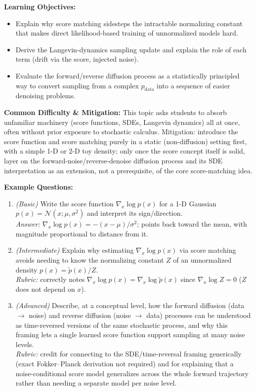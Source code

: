 \documentclass[11pt]{article}
\begin{document}
\textbf{Learning Objectives:}
\begin{itemize}
  \item Explain why score matching sidesteps the intractable normalizing constant that makes direct likelihood-based training of unnormalized models hard.
  \item Derive the Langevin-dynamics sampling update and explain the role of each term (drift via the score, injected noise).
  \item Evaluate the forward/reverse diffusion process as a statistically principled way to convert sampling from a complex $p_{\text{data}}$ into a sequence of easier denoising problems.
\end{itemize}

\textbf{Common Difficulty \& Mitigation:} This topic asks students to absorb unfamiliar machinery (score functions, SDEs, Langevin dynamics) all at once, often without prior exposure to stochastic calculus. Mitigation: introduce the score function and score matching purely in a static (non-diffusion) setting first, with a simple 1-D or 2-D toy density; only once the score concept itself is solid, layer on the forward-noise/reverse-denoise diffusion process and its SDE interpretation as an extension, not a prerequisite, of the core score-matching idea.

\textbf{Example Questions:}
\begin{enumerate}
  \item \textit{(Basic)} Write the score function $\nabla_x \log p(x)$ for a 1-D Gaussian $p(x) = \mathcal N(x;\mu,\sigma^2)$ and interpret its sign/direction. \\
  \textit{Answer:} $\nabla_x \log p(x) = -(x-\mu)/\sigma^2$; points back toward the mean, with magnitude proportional to distance from it.
  \item \textit{(Intermediate)} Explain why estimating $\nabla_x \log p(x)$ via score matching avoids needing to know the normalizing constant $Z$ of an unnormalized density $p(x) = \tilde p(x)/Z$. \\
  \textit{Rubric:} correctly notes $\nabla_x \log p(x) = \nabla_x \log \tilde p(x)$ since $\nabla_x \log Z = 0$ ($Z$ does not depend on $x$).
  \item \textit{(Advanced)} Describe, at a conceptual level, how the forward diffusion (data $\to$ noise) and reverse diffusion (noise $\to$ data) processes can be understood as time-reversed versions of the same stochastic process, and why this framing lets a single learned score function support sampling at many noise levels. \\
  \textit{Rubric:} credit for connecting to the SDE/time-reversal framing generically (exact Fokker--Planck derivation not required) and for explaining that a noise-conditional score model generalizes across the whole forward trajectory rather than needing a separate model per noise level.
\end{enumerate}
\end{document}
